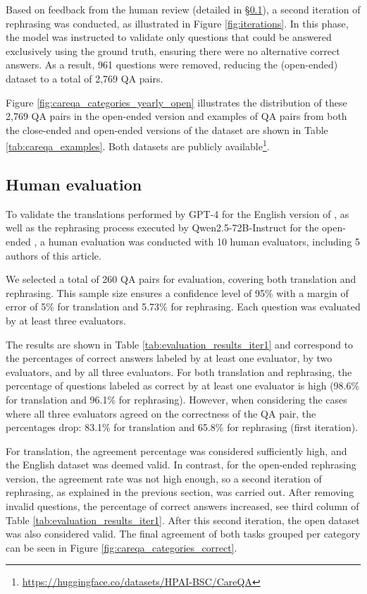 Based on feedback from the human review (detailed in \S\ref{sec:human_eval}), a second iteration of rephrasing was conducted, as illustrated in Figure \ref{fig:iterations}. In this phase, the model was instructed to validate only questions that could be answered exclusively using the ground truth, ensuring there were no alternative correct answers. As a result, 961 questions were removed, reducing the \careqa{} (open-ended) dataset to a total of 2,769 QA pairs. 

Figure \ref{fig:careqa_categories_yearly_open} illustrates the distribution of these 2,769 QA pairs in the open-ended version and examples of QA pairs from both the close-ended and open-ended versions of the \careqa{} dataset are shown in Table \ref{tab:careqa_examples}. Both datasets are publicly available\footnote{\url{https://huggingface.co/datasets/HPAI-BSC/CareQA}}.


\subsection{Human evaluation}\label{sec:human_eval}

To validate the translations performed by GPT-4 for the English version of \careqa, as well as the rephrasing process executed by Qwen2.5-72B-Instruct for the open-ended \careqa, a human evaluation was conducted with 10 human evaluators, including 5 authors of this article.

We selected a total of 260 QA pairs for evaluation, covering both translation and rephrasing. This sample size ensures a confidence level of 95\% with a margin of error of 5\% for translation and 5.73\% for rephrasing. Each question was evaluated by at least three evaluators. 




The results are shown in Table \ref{tab:evaluation_results_iter1} and correspond to the percentages of correct answers labeled by at least one evaluator, by two evaluators, and by all three evaluators. For both translation and rephrasing, the percentage of questions labeled as correct by at least one evaluator is high (98.6\% for translation and 96.1\% for rephrasing). However, when considering the cases where all three evaluators agreed on the correctness of the QA pair, the percentages drop: 83.1\% for translation and 65.8\% for rephrasing (first iteration).


For translation, the agreement percentage was considered sufficiently high, and the English dataset was deemed valid. In contrast, for the open-ended rephrasing version, the agreement rate was not high enough, so a second iteration of rephrasing, as explained in the previous section, was carried out. After removing invalid questions, the percentage of correct answers increased, see third column of Table \ref{tab:evaluation_results_iter1}. After this second iteration, the open dataset was also considered valid. The final agreement of both tasks grouped per category can be seen in Figure \ref{fig:careqa_categories_correct}.


